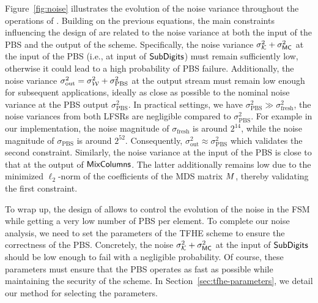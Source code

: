 Figure~\ref{fig:noise} illustrates the evolution of the noise variance throughout the operations of \coolName.
Building on the previous equations, the main constraints influencing the design of \coolName are related to the noise variance at both the input of the PBS and the output of the scheme. Specifically, the noise variance $\sigma_{\mathcal{K}}^2+\sigma^2_{\text{\textsf{MC}}}$ at the input of the PBS (i.e., at input of $\text{\textsf{SubDigits}}$) must remain sufficiently low, otherwise it could lead to a high probability of PBS failure. Additionally, the noise variance $\sigma^2_{\text{out}}  = \sigma_{\mathcal{W}}^2 + \sigma_{\text{PBS}}^2$ at the output stream must remain low enough for subsequent applications, ideally as close as possible to the nominal noise variance at the PBS output $\sigma_{\text{PBS}}^2$. In practical settings, we have $\sigma_{\text{PBS}}^2 \gg \sigma_{\text{fresh}}^2$, the noise variances from both LFSRs are negligible compared to $\sigma_{\text{PBS}}^2$. For example in our implementation, the noise magnitude of $\sigma_{\text{fresh}}$ is around $2^{14}$, while the noise magnitude of $\sigma_{\text{PBS}}$ is around $2^{52}$. Consequently, $\sigma^2_{\text{out}} \approx \sigma_{\text{PBS}}^2$ which validates the second constraint. Similarly, the noise variance at the input of the PBS is close to that at the output of $\text{\textsf{MixColumns}}$. The latter additionally remains low due to the minimized $\ell_2$-norm of the coefficients of the MDS matrix $M$, thereby validating the first constraint.


To wrap up, the design of \coolName{} allows to control the evolution of the noise in the FSM while getting a very low number of PBS per element. To complete our noise analysis, we need to set the parameters of the TFHE scheme to ensure the correctness of the PBS. Concretely, the noise \( \sigma_{\mathcal{K}}^2 + \sigma^2_{\text{\textsf{MC}}} \) at the input of \( \text{\textsf{SubDigits}} \) should be low enough to fail with a negligible probability. Of course, these parameters must ensure that the PBS operates as fast as possible while maintaining the security of the scheme. In Section~\ref{sec:tfhe-parameters}, we detail our method for selecting the parameters.








